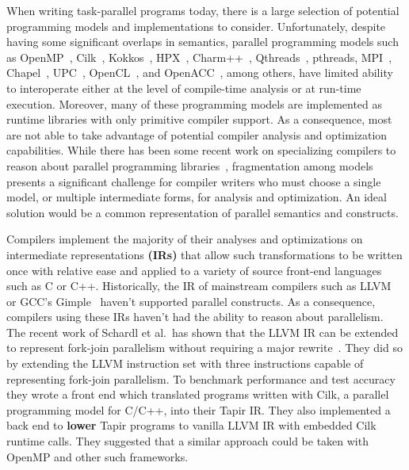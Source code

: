 \documentclass[sigconf]{acmart}
\newcommand{\wmnote}[1]{{\scriptsize \color{red} [[ Billy: #1]]}}
\newcommand{\gsnote}[1]{{\scriptsize \color{blue} [[ George: #1]]}}
\begin{document}
When writing task-parallel programs today, there is a large selection of
potential programming models and implementations to consider. Unfortunately,
despite having some significant overlaps in semantics, parallel programming
models such as OpenMP~\cite{openmp}, Cilk~\cite{cilk}, Kokkos~\cite{kokkos},
HPX~\cite{hpx}, Charm++~\cite{charm}, Qthreads~\cite{qthreads},
pthreads\cite{pthreads}, MPI~\cite{mpi}, Chapel~\cite{chapel}, UPC~\cite{upc},
OpenCL~\cite{opencl}, and OpenACC~\cite{openacc}, among others, have limited ability to
interoperate either at the level of compile-time analysis or at run-time
execution. Moreover, many of these programming models are implemented as
runtime libraries with only primitive compiler support. As a consequence, most are
not able to take advantage of potential compiler analysis and optimization
capabilities.  While there has been some recent work on specializing
compilers to reason about parallel programming libraries~\cite{Moss_2016},
fragmentation among models presents a significant challenge for compiler
writers who must choose a single model, or multiple intermediate forms, for
analysis and optimization. An ideal solution would be a 
common representation of parallel semantics and constructs.



Compilers implement the majority of their analyses and optimizations on
intermediate representations \textbf{(IRs)} that allow such transformations
to be written once with relative ease and applied to a variety of source
front-end languages such as C or C++.  Historically, the IR of mainstream
compilers such as LLVM~\cite{lattner2004llvm} or GCC's
Gimple~\cite{merrill2003generic} haven't supported parallel constructs. As a
consequence, compilers using these IRs haven't had the ability to reason
about parallelism. The recent work of Schardl et al.\ has shown
that the LLVM IR can be extended to represent fork-join parallelism without
requiring a major rewrite~\cite{tapir}.  They did so by extending the LLVM instruction set
with three instructions capable of representing fork-join parallelism. To
benchmark performance and test accuracy they wrote a front end which translated
programs written with Cilk, a parallel programming model for C/C++, into their
Tapir IR. They also implemented a back end to \textbf{lower} Tapir programs to
vanilla LLVM IR with embedded Cilk runtime calls. They suggested that a similar
approach could be taken with OpenMP and other such frameworks.
\end{document}
